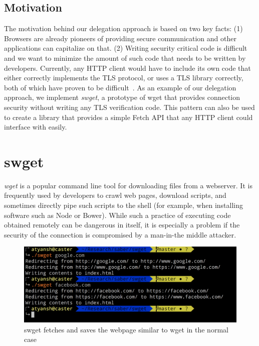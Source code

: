 \subsection{Motivation}
The motivation behind our delegation approach is based on two key facts: (1)
Browsers are already pioneers of providing secure communication and other
applications can capitalize on that. (2) Writing security critical code is
difficult and we want to minimize the amount of such code that needs to be
written by developers. Currently, any HTTP client would have to include its own
code that either correctly implements the TLS protocol, or uses a TLS library
correctly, both of which have proven to be difficult~\cite{dangerous}. As an
example of our delegation approach, we implement \emph{swget}, a prototype of
wget that provides connection security without writing any TLS verification
code. This pattern can also be used to create a library that provides a simple
Fetch API that any HTTP client could interface with easily.

\section{swget}
\label{sec:swget-saber}

\emph{wget} is a popular command line tool for downloading files from a
webserver. It is frequently used by developers to crawl web pages, download
scripts, and sometimes directly pipe such scripts to the shell (for example,
when installing software such as Node or Bower). While such a practice of
executing code obtained remotely can be dangerous in itself, it is especially a
problem if the security of the connection is compromised by a man-in-the middle
attacker.

\begin{figure}[h]
  \includegraphics[width=\textwidth]{figures/regular}
  \caption[Regular usage of swget]{swget fetches and saves the webpage similar
  to wget in the normal case}
  \label{fig:regular-saber}
\end{figure}

